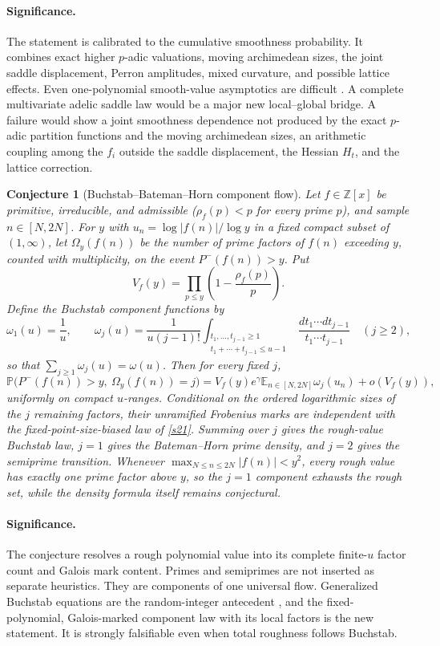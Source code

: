 \documentclass[11pt]{article}
\newtheorem{conjecture}{Conjecture}
\theoremstyle{definition}
\newcommand{\E}{\mathbb E}
\newcommand{\Pp}{\mathbb P}
\newcommand{\Z}{\mathbb Z}
\providecommand{\Z}{\mathbb Z}
\providecommand{\E}{\mathbb E}
\providecommand{\Pp}{\mathbb P}
\begin{document}
\paragraph{Significance.}
The statement is calibrated to the cumulative smoothness probability.  It combines exact higher $p$-adic valuations, moving
archimedean sizes, the joint saddle displacement, Perron amplitudes, mixed curvature, and
possible lattice effects.  Even one-polynomial smooth-value asymptotics are difficult
\cite{MartinSmooth,Mine}.  A complete multivariate adelic saddle law would be a major new local--global bridge. A failure would show a joint smoothness dependence not produced by the exact $p$-adic partition functions and the moving archimedean sizes, an arithmetic coupling among the $f_i$ outside the saddle displacement, the Hessian $H_t$, and the lattice correction.

\begin{conjecture}[Buchstab--Bateman--Horn component flow]\label{s25}
Let $f\in\Z[x]$ be primitive, irreducible, and admissible ($\rho_f(p)<p$ for every prime $p$), and sample
$n\in[N,2N]$.  For $y$ with
$u_n=\log|f(n)|/\log y$ in a fixed compact subset of $(1,\infty)$, let
$\Omega_y(f(n))$ be the number of prime factors of $f(n)$ exceeding $y$, counted with
multiplicity, on the event $P^-(f(n))>y$.  Put
\[
 V_f(y)=\prod_{p\le y}\left(1-\frac{\rho_f(p)}p\right).
\]
Define the Buchstab component functions by
\[
 \omega_1(u)=\frac1u,
 \qquad
 \omega_j(u)=\frac{1}{u(j-1)!}
 \int_{\substack{t_1,\ldots,t_{j-1}\ge1\\
 t_1+\cdots+t_{j-1}\le u-1}}
 \frac{dt_1\cdots dt_{j-1}}{t_1\cdots t_{j-1}}
 \quad(j\ge2),
\]
so that $\sum_{j\ge1}\omega_j(u)=\omega(u)$.  Then for every fixed $j$,
\[
 \Pp\bigl(P^-(f(n))>y,\ \Omega_y(f(n))=j\bigr)
 =V_f(y)e^\gamma\E_{n\in[N,2N]}\omega_j(u_n)+o(V_f(y)),
\]
uniformly on compact $u$-ranges.  Conditional on the ordered logarithmic sizes of the
$j$ remaining factors, their unramified Frobenius marks are independent with the
fixed-point-size-biased law of \cref{s21}.  Summing over $j$ gives the rough-value
Buchstab law, $j=1$ gives the Bateman--Horn prime density, and $j=2$ gives the
semiprime transition.  Whenever $\max_{N\le n\le2N}|f(n)|<y^2$, every rough value has exactly one prime
factor above $y$, so the $j=1$ component exhausts the rough set, while the density
formula itself remains conjectural.
\end{conjecture}

\paragraph{Significance.}
The conjecture resolves a rough polynomial value into its complete finite-$u$ factor
count and Galois mark content.  Primes and semiprimes are not inserted as separate
heuristics.  They are components of one universal flow.  Generalized Buchstab equations
are the random-integer antecedent \cite{Moree}, and the fixed-polynomial,
Galois-marked component law with its local factors is the new statement.  It is strongly falsifiable even when
total roughness follows Buchstab.
\end{document}
